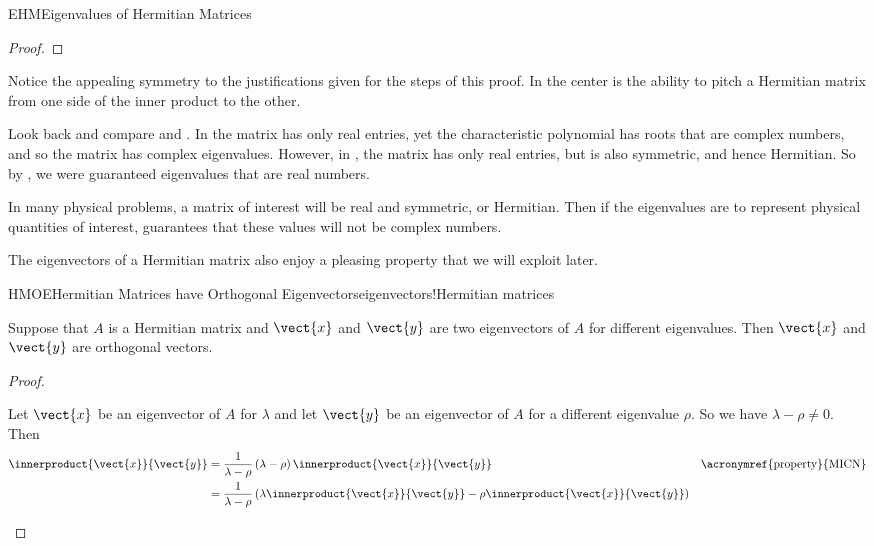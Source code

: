\begin{subsect}{EHM}{Eigenvalues of Hermitian Matrices}
\begin{proof}
%
\end{proof}
%
\begin{para}Notice the appealing symmetry to the justifications given for the steps of this proof.  In the center is the ability to pitch a Hermitian matrix from one side of the inner product to the other.\end{para}
%
\begin{para}Look back and compare  and .   In  the matrix has only real entries, yet the characteristic polynomial has roots that are complex numbers, and so the matrix has complex eigenvalues.  However, in , the matrix has only real entries, but is also symmetric, and hence Hermitian.  So by , we were guaranteed eigenvalues that are real numbers.\end{para}
%
\begin{para}In many physical problems, a matrix of interest will be real and symmetric, or Hermitian.  Then if the eigenvalues are to represent physical quantities of interest,  guarantees that these values will not be complex numbers.\end{para}
%
\begin{para}The eigenvectors of a Hermitian matrix also enjoy a pleasing property that we will exploit later.\end{para}
%
%
\begin{theorem}{HMOE}{Hermitian Matrices have Orthogonal Eigenvectors}{eigenvectors!Hermitian matrices}
\begin{para}Suppose that $A$ is a Hermitian matrix and $\vect{x}$ and $\vect{y}$ are two eigenvectors of $A$ for different eigenvalues.  Then $\vect{x}$ and $\vect{y}$ are orthogonal vectors.\end{para}
\end{theorem}
%
\begin{proof}
\begin{para}Let $\vect{x}$ be an eigenvector of $A$ for $\lambda$ and let $\vect{y}$ be an eigenvector of $A$ for a different eigenvalue $\rho$.   So we have $\lambda-\rho\neq 0$.  Then
%
\begin{align*}
%
\innerproduct{\vect{x}}{\vect{y}}
%
&=\frac{1}{\lambda-\rho}\left(\lambda-\rho\right)\innerproduct{\vect{x}}{\vect{y}}
&&\text{\acronymref{property}{MICN}}\\
%
&=\frac{1}{\lambda-\rho}
\left(\lambda\innerproduct{\vect{x}}{\vect{y}}-\rho\innerproduct{\vect{x}}{\vect{y}}\right)

\end{align*}
\end{para}
\end{proof}
\end{subsect}
